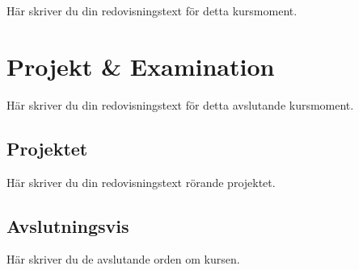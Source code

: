 \documentclass[oneside]{book}
\begin{document}
Här skriver du din redovisningstext för detta kursmoment.



\chapter{Projekt \& Examination}

Här skriver du din redovisningstext för detta avslutande kursmoment.

\section{Projektet}

Här skriver du din redovisningstext rörande projektet.

\section{Avslutningsvis}

Här skriver du de avslutande orden om kursen.



\newpage
\printbibliography
\end{document}
